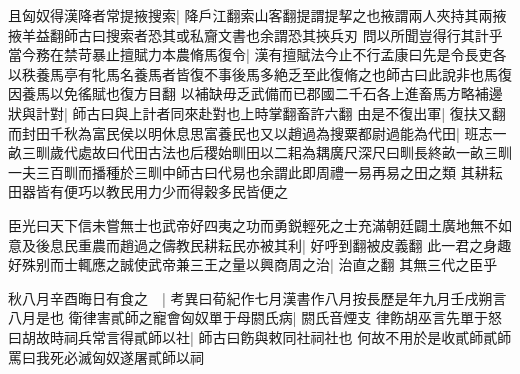 且匈奴得漢降者常提掖搜索|{
	降戶江翻索山客翻提謂提挈之也掖謂兩人夾持其兩掖掖羊益翻師古曰搜索者恐其或私齎文書也余謂恐其挾兵刃}
問以所聞豈得行其計乎當今務在禁苛暴止擅賦力本農脩馬復令|{
	漢有擅賦法今止不行孟康曰先是令長吏各以秩養馬亭有牝馬名養馬者皆復不事後馬多絶乏至此復脩之也師古曰此說非也馬復因養馬以免徭賦也復方目翻}
以補缺毋乏武備而已郡國二千石各上進畜馬方略補邊狀與計對|{
	師古曰與上計者同來赴對也上時掌翻畜許六翻}
由是不復出軍|{
	復扶又翻}
而封田千秋為富民侯以明休息思富養民也又以趙過為搜粟都尉過能為代田|{
	班志一畝三甽歲代處故曰代田古法也后稷始甽田以二耜為耦廣尺深尺曰甽長終畝一畝三甽一夫三百甽而播種於三甽中師古曰代易也余謂此即周禮一易再易之田之類}
其耕耘田器皆有便巧以教民用力少而得穀多民皆便之

臣光曰天下信未嘗無士也武帝好四夷之功而勇鋭輕死之士充滿朝廷闢土廣地無不如意及後息民重農而趙過之儔教民耕耘民亦被其利|{
	好呼到翻被皮義翻}
此一君之身趣好殊别而士輒應之誠使武帝兼三王之量以興商周之治|{
	治直之翻}
其無三代之臣乎

秋八月辛酉晦日有食之　|{
	考異曰荀紀作七月漢書作八月按長歷是年九月壬戌朔言八月是也}
衛律害貳師之寵會匈奴單于母閼氏病|{
	閼氏音煙支}
律飭胡巫言先單于怒曰胡故時祠兵常言得貳師以社|{
	師古曰飭與敕同社祠社也}
何故不用於是收貳師貳師罵曰我死必滅匈奴遂屠貳師以祠

